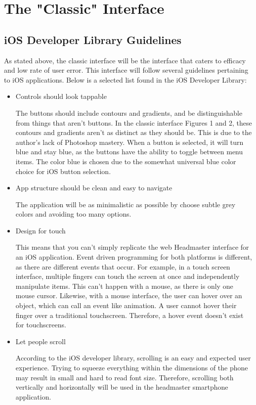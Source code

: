 \documentclass{article}
\begin{document}
\section{The "Classic" Interface}
\label{The "Classic" Interface}

\subsection{iOS Developer Library Guidelines}

As stated above, the classic interface will be the interface that caters to efficacy and low rate of user error.  This interface will follow several guidelines pertaining to iOS applications.  Below is a selected list found in the iOS Developer Library:\\

\begin{itemize}
\item  Controls should look tappable

The buttons should include contours and gradients, and be distinguishable from things that aren’t buttons.  In the classic interface Figures 1 and 2, these contours and gradients aren’t as distinct as they should be.  This is due to the author’s lack of Photoshop mastery.  When a button is selected, it will turn blue and stay blue, as the buttons have the ability to toggle between menu items.  The color blue is chosen due to the somewhat universal blue color choice for iOS button selection.\\

\item App structure should be clean and easy to navigate

The application will be as minimalistic as possible by choose subtle grey colors and avoiding too many options.\\

\item Design for touch

This means that you can’t simply replicate the web Headmaster interface for an iOS application.  Event driven programming for both platforms is different, as there are different events that occur.  For example, in a touch screen interface, multiple fingers can touch the screen at once and independently manipulate items.  This can’t happen with a mouse, as there is only one mouse cursor.  Likewise, with a mouse interface, the user can hover over an object, which can call an event like animation.  A user cannot hover their finger over a traditional touchscreen.  Therefore, a hover event doesn’t exist for touchscreens.\\

\item Let people scroll

According to the iOS developer library, scrolling is an easy and expected user experience.  Trying to squeeze everything within the dimensions of the phone may result in small and hard to read font size.  Therefore, scrolling both vertically and horizontally will be used in the headmaster smartphone application.\\
\end{itemize}
\end{document}
